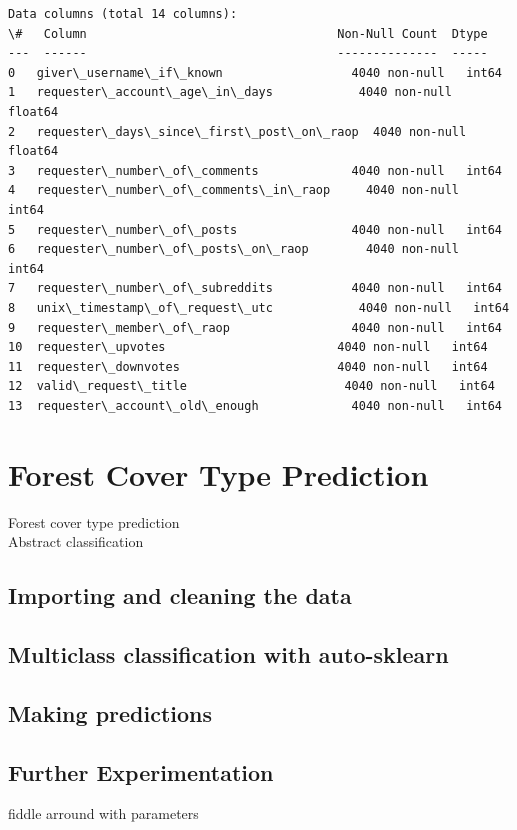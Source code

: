 \documentclass[a4paper, 12pt, twoside]{report}
\begin{document}
\begin{Verbatim}[commandchars=\\\{\}]
Data columns (total 14 columns):
\#   Column                                   Non-Null Count  Dtype
---  ------                                   --------------  -----
0   giver\_username\_if\_known                  4040 non-null   int64
1   requester\_account\_age\_in\_days            4040 non-null   float64
2   requester\_days\_since\_first\_post\_on\_raop  4040 non-null   float64
3   requester\_number\_of\_comments             4040 non-null   int64
4   requester\_number\_of\_comments\_in\_raop     4040 non-null   int64
5   requester\_number\_of\_posts                4040 non-null   int64
6   requester\_number\_of\_posts\_on\_raop        4040 non-null   int64
7   requester\_number\_of\_subreddits           4040 non-null   int64
8   unix\_timestamp\_of\_request\_utc            4040 non-null   int64
9   requester\_member\_of\_raop                 4040 non-null   int64
10  requester\_upvotes                        4040 non-null   int64
11  requester\_downvotes                      4040 non-null   int64
12  valid\_request\_title                      4040 non-null   int64
13  requester\_account\_old\_enough             4040 non-null   int64
\end{Verbatim}


\clearpage

\section{Forest Cover Type Prediction}
\label{sec:multiclass-classification}
Forest cover type prediction\\
Abstract classification

\subsection{Importing and cleaning the data}

\subsection{Multiclass classification with auto-sklearn}

\subsection{Making predictions}

\subsection{Further Experimentation}
fiddle arround with parameters
\end{document}
